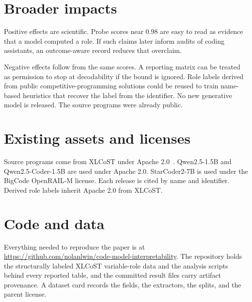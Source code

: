 \documentclass{article}
\begin{document}
\section{Broader impacts}
\label{app:impacts}
Positive effects are scientific. Probe scores near $0.98$ are easy to read as
evidence that a model computed a role. If such claims later inform audits of
coding assistants, an outcome-aware record reduces that overclaim.

Negative effects follow from the same scores. A reporting matrix can be treated
as permission to stop at decodability if the bound is ignored. Role labels
derived from public competitive-programming solutions could be reused to train
name-based heuristics that recover the label from the identifier. No new
generative model is released. The source programs were already public.

\section{Existing assets and licenses}
\label{app:licenses}
Source programs come from XLCoST under Apache 2.0~\citep{zhu2022xlcost}.
Qwen2.5-1.5B and Qwen2.5-Coder-1.5B are used under Apache 2.0.
StarCoder2-7B is used under the BigCode OpenRAIL-M license. Each release is
cited by name and identifier. Derived role labels inherit Apache 2.0 from
XLCoST.

\section{Code and data}
\label{app:assets}
Everything needed to reproduce the paper is at
\url{https://github.com/nolanlwin/code-model-interpretability}. The repository holds
the structurally labeled XLCoST variable-role data and the analysis scripts
behind every reported table, and the committed result files carry artifact
provenance. A dataset card records the fields, the extractors, the splits, and
the parent license.

\end{document}
